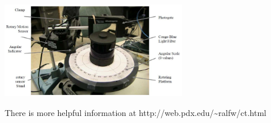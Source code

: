 \documentclass[12pt]{article}
\begin{document}
\begin{center}
\includegraphics[width=0.6\textwidth]{opticalct.png}
\end{center}

There is more helpful information at http://web.pdx.edu/\~{}ralfw/ct.html


\newpage

%
%
%
%
\end{document}
